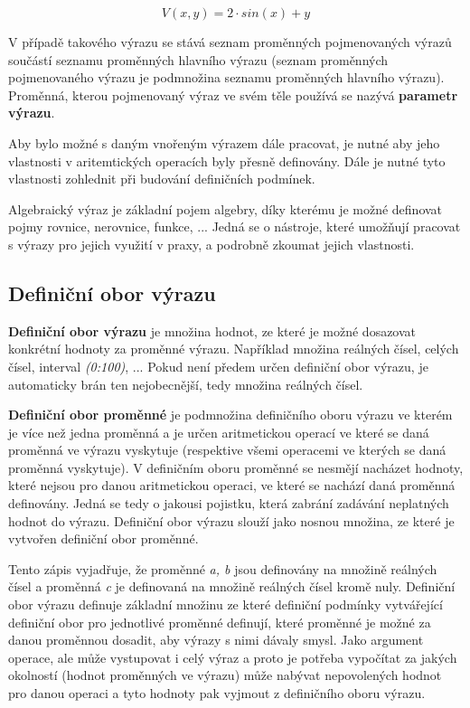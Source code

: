 \documentclass[11pt]{article}
\begin{document}
$$ V(x,y) = 2\cdot sin(x) + y $$

V případě  takového výrazu se stává seznam proměnných pojmenovaných výrazů součástí seznamu proměnných hlavního výrazu (seznam proměnných pojmenovaného výrazu je podmnožina seznamu proměnných hlavního výrazu). Proměnná, kterou pojmenovaný výraz ve svém těle používá se nazývá {\bf parametr výrazu}. 

Aby bylo možné s daným vnořeným výrazem dále pracovat, je nutné aby jeho vlastnosti v aritemtických operacích byly přesně definovány. Dále je nutné tyto vlastnosti zohlednit při budování definičních podmínek.

Algebraický výraz je základní pojem algebry, díky kterému je možné definovat pojmy rovnice, nerovnice, funkce, ... Jedná se o nástroje, které umožňují pracovat s výrazy pro jejich využití v praxy, a podrobně zkoumat jejich vlastnosti.

\subsection{Definiční obor výrazu}

{\bf Definiční obor výrazu} je množina hodnot, ze které je možné dosazovat konkrétní hodnoty za proměnné výrazu. Například množina reálných čísel, celých čísel, interval {\it (0:100)}, ... Pokud není předem určen definiční obor výrazu, je automaticky brán ten nejobecnější, tedy množina reálných čísel.

{\bf Definiční obor proměnné} je podmnožina definičního oboru výrazu ve kterém je více než jedna proměnná a je určen aritmetickou operací ve které se daná proměnná ve výrazu vyskytuje (respektive všemi operacemi ve kterých se daná proměnná vyskytuje).  V definičním oboru proměnné se nesmějí nacházet hodnoty, které nejsou pro danou aritmetickou operaci, ve které se nachází daná proměnná definovány. Jedná se tedy o jakousi pojistku, která zabrání zadávání neplatných hodnot do výrazu. Definiční obor výrazu slouží jako nosnou množina, ze které je vytvořen definiční obor proměnné.

\begin{center}
\end{center}

Tento zápis vyjadřuje, že proměnné {\it a, b} jsou definovány na množině reálných čísel a proměnná {\it c} je definovaná na množině reálných čísel kromě nuly. Definiční obor výrazu definuje základní množinu ze které definiční podmínky vytvářející definiční obor pro jednotlivé proměnné definují, které proměnné je možné za danou proměnnou dosadit, aby výrazy s nimi dávaly smysl. Jako argument operace, ale může vystupovat i celý výraz a proto je potřeba vypočítat za jakých okolností (hodnot proměnných ve výrazu) může nabývat nepovolených hodnot pro danou operaci a tyto hodnoty pak vyjmout z definičního oboru výrazu.
\end{document}
